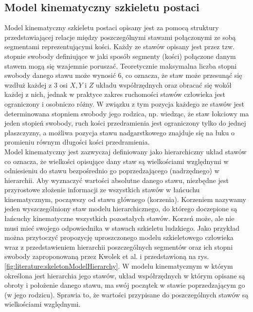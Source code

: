 \subsection{Model kinematyczny szkieletu postaci}
Model kinematyczny szkieletu postaci opisany jest za pomocą struktury przedstawiającej relacje między poszczególnymi stawami połączonymi ze sobą segmentami reprezentującymi kości. Każdy ze stawów opisany jest przez tzw. stopnie swobody definiujące w jaki sposób segmenty (kości) połączone danym stawem mogą się wzajemnie poruszać. Teoretycznie maksymalna liczba stopni swobody danego stawu może wynosić 6, co oznacza, że staw może przesunąć się wzdłuż każdej z 3 osi $X, Y$ i $Z$ układu współrzędnych oraz obracać się wokół każdej z nich, jednak w praktyce zakres ruchomości stawów człowieka jest ograniczony i osobniczo różny. W związku z tym pozycja każdego ze stawów jest determinowana stopniem swobody jego rodzica, np. wiedząc, że staw łokciowy ma jeden stopień swobody, ruch kości przedramienia jest ograniczony tylko do jednej płaszczyzny, a możliwa pozycja stawu nadgarstkowego znajduje się na łuku o promieniu równym długości kości przedramienia.\\

Model kinematyczny jest zazwyczaj definiowany jako hierarchiczny układ stawów co oznacza, że wielkości opisujące dany staw są wielkościami względnymi w odniesieniu do stawu bezpośrednio go poprzedzającego (nadrzędnego) w hierarchii. Aby wyznaczyć wartości absolutne danego stawu, niezbędne jest przyrostowe złożenie informacji ze wszystkich stawów w łańcuchu kinematycznym, począwszy od stawu głównego (korzenia). Korzeniem nazywamy jeden wyszczególniony staw modelu hierarchicznego, do którego doczepione są łańcuchy kinematyczne wszystkich pozostałych stawów. Korzeń może, ale nie musi mieć swojego odpowiednika w stawach szkieletu ludzkiego. Jako przykład można przytoczyć propozycję uproszczonego modelu szkieletowego człowieka wraz z przedstawieniem hierarchii poszczególnych segmentów oraz ich stopni swobody zaproponowaną przez Kwolek et al.\cite{Kwolek2014} i przedstawioną na rys. \ref{fig:literature:skeletonModelHierarchy}. W modelu kinematycznym w którym określona jest hierarchia jego stawów, układ współrzędnych w którym opisane są obroty i położenie danego stawu, ma swój początek w stawie poprzedzającym go (w jego rodzicu). Sprawia to, że wartości przypisane do poszczególnych stawów są wielkościami względnymi.

